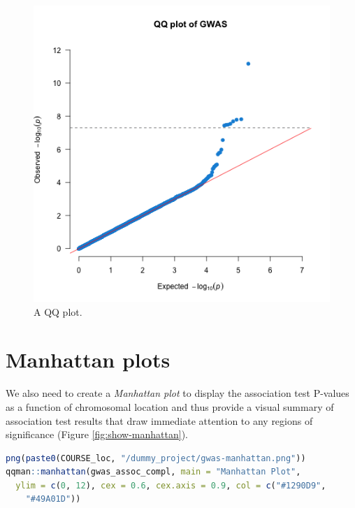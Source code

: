 \documentclass[
]{book}
\begin{document}
\begin{figure}[H]

{\centering \includegraphics[width=6.67in]{img/_gwas_dummy/show-qq} 

}

\caption{A QQ plot.}\label{fig:show-qq}
\end{figure}

\hypertarget{manhattan-plots}{%
\section{Manhattan plots}\label{manhattan-plots}}

We also need to create a \emph{Manhattan plot} to display the association test P-values as a function of chromosomal location and thus provide a visual summary of association test results that draw immediate attention to any regions of significance (Figure \ref{fig:show-manhattan}).

\begin{lstlisting}[language=R]
png(paste0(COURSE_loc, "/dummy_project/gwas-manhattan.png"))
qqman::manhattan(gwas_assoc_compl, main = "Manhattan Plot",
  ylim = c(0, 12), cex = 0.6, cex.axis = 0.9, col = c("#1290D9",
    "#49A01D"))
\end{lstlisting}
\end{document}
